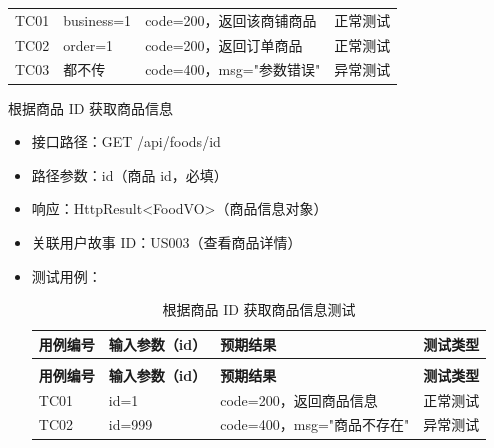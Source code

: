 \begin{levellist}
\begin{levellist}
\begin{itemize}
\begin{longtable}{>{\centering\arraybackslash}m{1.7cm} >{\centering\arraybackslash}m{3cm} >{\centering\arraybackslash}m{6.3cm} >{\centering\arraybackslash}m{2cm}}
                      \bottomrule
                      \endfoot

                      TC01          & business=1        & code=200，返回该商铺商品    & 正常测试          \\
                      TC02          & order=1           & code=200，返回订单商品     & 正常测试          \\
                      TC03          & 都不传               & code=400，msg="参数错误" & 异常测试          \\
                  \end{longtable}
        \end{itemize}

        \item 根据商品 ID 获取商品信息
        \begin{itemize}
            \item 接口路径：GET /api/foods/{id}
            \item 路径参数：id（商品 id，必填）
            \item 响应：HttpResult<FoodVO>（商品信息对象）
            \item 关联用户故事 ID：US003（查看商品详情）
            \item 测试用例：
                  \begin{longtable}{>{\centering\arraybackslash}m{1.7cm} >{\centering\arraybackslash}m{3cm} >{\centering\arraybackslash}m{6.3cm} >{\centering\arraybackslash}m{2cm}}

                      \caption{根据商品 ID 获取商品信息测试} \label{tab:training}                          \\

                      \toprule
                      \textbf{用例编号} & \textbf{输入参数（id）} & \textbf{预期结果}        & \textbf{测试类型} \\
                      \midrule
                      \endfirsthead

                      \multicolumn{4}{c}{{\tablename\ \thetable{} 续表}}                         \\
                      \toprule
                      \textbf{用例编号} & \textbf{输入参数（id）} & \textbf{预期结果}        & \textbf{测试类型} \\
                      \midrule
                      \endhead

                      \bottomrule
                      \endfoot


                      TC01          & id=1              & code=200，返回商品信息      & 正常测试          \\
                      TC02          & id=999            & code=400，msg="商品不存在" & 异常测试          \\
                  \end{longtable}
        \end{itemize}


\end{levellist}
\end{levellist}
